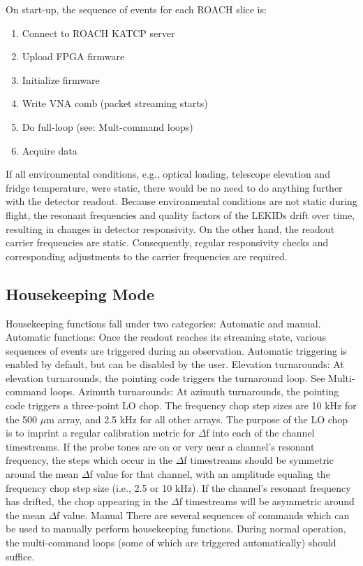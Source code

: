 On start-up, the sequence of events for each ROACH slice is:
\begin{enumerate}
 \item  Connect to ROACH KATCP server
 \item  Upload FPGA firmware
 \item  Initialize firmware
 \item  Write VNA comb (packet streaming starts)
 \item  Do full-loop (see: Mult-command loops)
 \item  Acquire data
\end{enumerate}

If all environmental conditions, e.g., optical loading, telescope elevation and fridge temperature, were static, there would be no need to do anything further with the detector readout. Because environmental conditions are not static during flight, the resonant frequencies and quality factors of the LEKIDs drift over time, resulting in changes in detector responsivity. On the other hand, the readout carrier frequencies are static. Consequently, regular responsivity checks and corresponding adjustments to the carrier frequencies are required.

\subsection{Housekeeping Mode}
Housekeeping functions fall under two categories: Automatic and manual.
Automatic functions:
Once the readout reaches its streaming state, various sequences of events are triggered during an observation. Automatic triggering is enabled by default, but can be disabled by the user.
Elevation turnarounds: At elevation turnarounds, the pointing code triggers the turnaround loop. See Multi-command loops.
Azimuth turnarounds: At azimuth turnarounds, the pointing code triggers a three-point LO chop. The frequency chop step sizes are 10 kHz for the 500 $\mu$m array, and 2.5 kHz for all other arrays. The purpose of the LO chop is to imprint a regular calibration metric for $\Delta$f into each of the channel timestreams. If the probe tones are on or very near a channel’s resonant frequency, the steps which occur in the $\Delta$f timestreams should be symmetric around the mean $\Delta$f value for that channel, with an amplitude equaling the frequency chop step size (i.e., 2.5 or 10 kHz). If the channel's resonant frequency has drifted, the chop appearing in the $\Delta$f timestreams will be asymmetric around the mean $\Delta$f value.
Manual
There are several sequences of commands which can be used to manually perform housekeeping functions. During normal operation, the multi-command loops (some of which are triggered automatically) should suffice.

